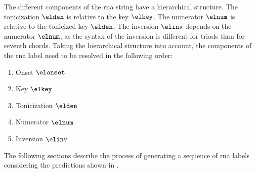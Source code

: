 The different components of the \gls{rna} string have a
hierarchical structure. The tonicization $\elden$ is
relative to the key $\elkey$. The numerator $\elnum$ is
relative to the tonicized key $\elden$. The inversion
$\elinv$ depends on the numerator $\elnum$, as the syntax of
the inversion is different for triads than for seventh
chords. Taking the hierarchical structure into account, the
components of the \gls{rna} label need to be resolved in the
following order:

\begin{enumerate}
    \item Onset $\elonset$
    \item Key $\elkey$
    \item Tonicization $\elden$
    \item Numerator $\elnum$
    \item Inversion $\elinv$
\end{enumerate}

The following sections describe the process of generating a
sequence of \gls{rna} labels considering the predictions
shown in .







